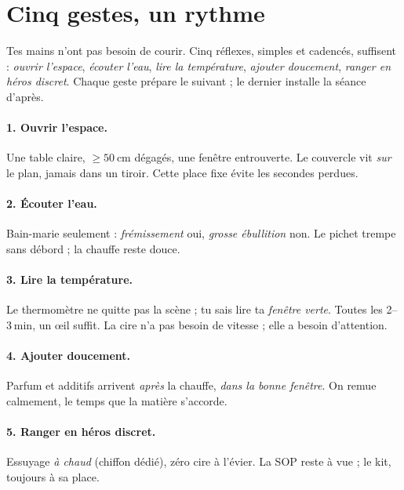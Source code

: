 \documentclass[../../main.tex]{subfiles}
\begin{document}
\section{Cinq gestes, un rythme}

Tes mains n’ont pas besoin de courir. Cinq réflexes, simples et cadencés, suffisent :
\textit{ouvrir l’espace}, \textit{écouter l’eau}, \textit{lire la température}, \textit{ajouter doucement}, \textit{ranger en héros discret}.
Chaque geste prépare le suivant ; le dernier installe la séance d’après.

\paragraph{1. Ouvrir l’espace.}
Une table claire, \(\geq 50\) cm dégagés, une fenêtre entrouverte. Le couvercle vit \textit{sur} le plan, jamais dans un tiroir. Cette place fixe évite les secondes perdues.

\paragraph{2. Écouter l’eau.}
Bain-marie seulement : \textit{frémissement} oui, \textit{grosse ébullition} non. Le pichet trempe sans débord ; la chauffe reste douce.

\paragraph{3. Lire la température.}
Le thermomètre ne quitte pas la scène ; tu sais lire ta \textit{fenêtre verte}. Toutes les 2–3 min, un œil suffit. La cire n’a pas besoin de vitesse ; elle a besoin d’attention.

\paragraph{4. Ajouter doucement.}
Parfum et additifs arrivent \textit{après} la chauffe, \textit{dans la bonne fenêtre}. On remue calmement, le temps que la matière s’accorde.

\paragraph{5. Ranger en héros discret.}
Essuyage \textit{à chaud} (chiffon dédié), zéro cire à l’évier. La SOP reste à vue ; le kit, toujours à sa place.
\end{document}
